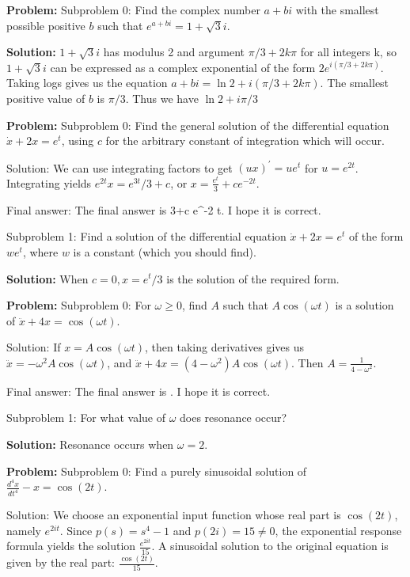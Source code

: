 \documentclass[10pt]{article}
\begin{document}
\textbf{Problem:}
Subproblem 0: Find the complex number $a+b i$ with the smallest possible positive $b$ such that $e^{a+b i}=1+\sqrt{3} i$. 


\textbf{Solution:}
$1+\sqrt{3} i$ has modulus 2 and argument $\pi / 3+2 k \pi$ for all integers k, so $1+\sqrt{3} i$ can be expressed as a complex exponential of the form $2 e^{i(\pi / 3+2 k \pi)}$. Taking logs gives us the equation $a+b i=\ln 2+i(\pi / 3+2 k \pi)$. The smallest positive value of $b$ is $\pi / 3$. Thus we have $\boxed{\ln 2 + i\pi / 3}$


\textbf{Problem:}
Subproblem 0: Find the general solution of the differential equation $\dot{x}+2 x=e^{t}$, using $c$ for the arbitrary constant of integration which will occur.


Solution: We can use integrating factors to get $(u x)^{\prime}=u e^{t}$ for $u=e^{2 t}$. Integrating yields $e^{2 t} x=e^{3 t} / 3+c$, or $x=\boxed{\frac{e^{t}} {3}+c e^{-2 t}}$. 

Final answer: The final answer is  {3}+c e^{-2 t}. I hope it is correct.

Subproblem 1: Find a solution of the differential equation $\dot{x}+2 x=e^{t}$ of the form $w e^{t}$, where $w$ is a constant (which you should find).


\textbf{Solution:}
When $c=0, x=\boxed{e^{t} / 3}$ is the solution of the required form. 


\textbf{Problem:}
Subproblem 0: For $\omega \geq 0$, find $A$ such that $A \cos (\omega t)$ is a solution of $\ddot{x}+4 x=\cos (\omega t)$.


Solution: If $x=A \cos (\omega t)$, then taking derivatives gives us $\ddot{x}=-\omega^{2} A \cos (\omega t)$, and $\ddot{x}+4 x=\left(4-\omega^{2}\right) A \cos (\omega t)$. Then $A=\boxed{\frac{1}{4-\omega^{2}}}$. 

Final answer: The final answer is . I hope it is correct.

Subproblem 1: For what value of $\omega$ does resonance occur? 


\textbf{Solution:}
Resonance occurs when $\omega=\boxed{2}$. 


\textbf{Problem:}
Subproblem 0: Find a purely sinusoidal solution of $\frac{d^{4} x}{d t^{4}}-x=\cos (2 t)$.


Solution: We choose an exponential input function whose real part is $\cos (2 t)$, namely $e^{2 i t}$. Since $p(s)=s^{4}-1$ and $p(2 i)=15 \neq 0$, the exponential response formula yields the solution $\frac{e^{2 i t}}{15}$. A sinusoidal solution to the original equation is given by the real part: $\boxed{\frac{\cos (2 t)}{15}}$. 
\end{document}
